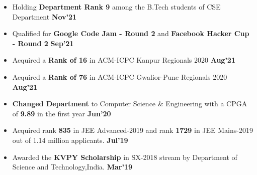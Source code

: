 \documentclass[10pt]{article}
\begin{document}
\vspace{-4ex}
\spacedhrule{0.15ex}{1.0ex}
\begin{itemize}[leftmargin=*]
\item Holding \textbf{Department Rank 9} among the B.Tech students of CSE Department {\hfill}\textbf{Nov'21}\\[-1.8em]
\item Qualified for \textbf{Google Code Jam - Round 2} and \textbf{Facebook Hacker Cup - Round 2} \href{https://github.com/Abhitipu/Abhitipu/blob/main/Proofs/Cp/Google_Codejam.png} {\hspace{1ex}\footnotesize\faMousePointer} \href{https://github.com/Abhitipu/Abhitipu/blob/main/Proofs/Cp/Fb_HackerCup.png} {\hspace{0.5ex}\footnotesize\faMousePointer} {\hfill}\textbf{Sep'21}\\[-1.8em]
\item Acquired a \textbf{Rank of 16} in ACM-ICPC Kanpur Regionals 2020 \href{https://github.com/Abhitipu/Abhitipu/blob/main/Proofs/Cp/Icpc_Kanpur.png} {\hspace{0.5ex}\footnotesize\faMousePointer} {\hfill}\textbf{Aug'21}\\[-1.8em]
\item Acquired a \textbf{Rank of 76} in ACM-ICPC Gwalior-Pune Regionals 2020 \href{https://github.com/Abhitipu/Abhitipu/blob/main/Proofs/Cp/Icpc_Gwalior_Pune.png} {\hspace{0.5ex}\footnotesize\faMousePointer} {\hfill}\textbf{Aug'21}\\[-1.8em]
\item \textbf{Changed Department} to Computer Science \& Engineering with a CPGA of \textbf{9.89} in the first year \href{https://github.com/Abhitipu/Abhitipu/blob/main/Proofs/Insti\%20docs/BranchChangeAbhinandanProof.pdf} {\hspace{0.5ex}\footnotesize\faMousePointer} {\hfill}\textbf{Jun'20}\\[-1.8em]
 \item Acquired rank \textbf{835} in JEE Advanced-2019 and rank \textbf{1729} in JEE Mains-2019 out of 1.14 million applicants. \href{https://github.com/Abhitipu/Abhitipu/tree/main/Proofs/Competitive\%20exams} {\hspace{0.5ex}\footnotesize\faMousePointer} {\hfill}\textbf{Jul'19}\\[-1.8em]
  \item Awarded the \textbf{KVPY Scholarship} in SX-2018 stream by Department of Science and Technology,India. \href{https://github.com/Abhitipu/Abhitipu/blob/main/Proofs/Competitive\%20exams/KVPYAbhinandanProof.pdf} {\hspace{0.5ex}\footnotesize\faMousePointer} {\hfill}\textbf{Mar'19}\\[-1.8em]
\end{itemize}
\end{document}
